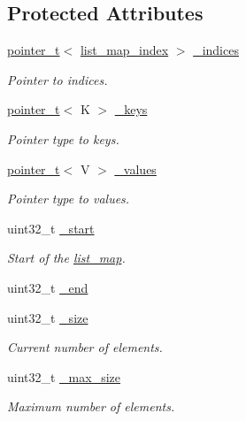 \subsection*{Protected Attributes}
\begin{DoxyCompactItemize}
\item 
\hyperlink{structcrap_1_1pointer__t}{pointer\+\_\+t}$<$ \hyperlink{structcrap_1_1list__map_1_1list__map__index}{list\+\_\+map\+\_\+index} $>$ \hyperlink{classcrap_1_1list__map_a3adb0e770ab21d2634db1fd04afffb27}{\+\_\+indices}
\begin{DoxyCompactList}\small\item\em Pointer to indices. \end{DoxyCompactList}\item 
\hyperlink{structcrap_1_1pointer__t}{pointer\+\_\+t}$<$ K $>$ \hyperlink{classcrap_1_1list__map_a2051a003947b8cd7eb227f2d4f102b89}{\+\_\+keys}
\begin{DoxyCompactList}\small\item\em Pointer type to keys. \end{DoxyCompactList}\item 
\hyperlink{structcrap_1_1pointer__t}{pointer\+\_\+t}$<$ V $>$ \hyperlink{classcrap_1_1list__map_acba7dbe40068c27c619e0f44235125c9}{\+\_\+values}
\begin{DoxyCompactList}\small\item\em Pointer type to values. \end{DoxyCompactList}\item 
uint32\+\_\+t \hyperlink{classcrap_1_1list__map_aff95986154fe7aa854edf0973e477f82}{\+\_\+start}
\begin{DoxyCompactList}\small\item\em Start of the \hyperlink{classcrap_1_1list__map}{list\+\_\+map}. \end{DoxyCompactList}\item 
uint32\+\_\+t \hyperlink{classcrap_1_1list__map_afa98ab282df5241b186bba9087f694cf}{\+\_\+end}
\item 
uint32\+\_\+t \hyperlink{classcrap_1_1list__map_a0bd6a5300ca68f956964a6d9edb02757}{\+\_\+size}
\begin{DoxyCompactList}\small\item\em Current number of elements. \end{DoxyCompactList}\item 
uint32\+\_\+t \hyperlink{classcrap_1_1list__map_a9197e36a3c061b0c4e030f3f31d28563}{\+\_\+max\+\_\+size}
\begin{DoxyCompactList}\small\item\em Maximum number of elements. \end{DoxyCompactList}\end{DoxyCompactItemize}


